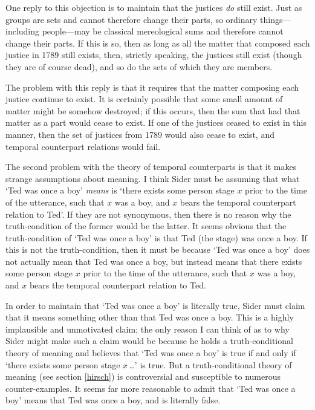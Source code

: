 \documentclass[11pt]{article}
\begin{document}
\begin{spacing}{1.5}
One reply to this objection is to maintain that the justices {\em do}
still exist.  Just as groups are sets and cannot therefore change
their parts, so ordinary things---including people---may be classical
mereological sums and therefore cannot change their parts.  If this is
so, then as long as all the matter that composed each justice in 1789
still exists, then, strictly speaking, the justices still exist
(though they are of course dead), and so do the sets of which they are
members.

The problem with this reply is that it requires that the matter
composing each justice continue to exist.  It is certainly possible
that some small amount of matter might be somehow destroyed; if this
occurs, then the sum that had that matter as a part would cease to
exist.  If one of the justices ceased to exist in this manner, then
the set of justices from 1789 would also cease to exist, and temporal
counterpart relations would fail.

The second problem with the theory of temporal counterparts is that it
makes strange assumptions about meaning.  I think Sider must be
assuming that what `Ted was once a boy' {\em means} is `there exists
some person stage $x$ prior to the time of the utterance, such that
$x$ was a boy, and $x$ bears the temporal counterpart relation to
Ted'.  If they are not synonymous, then there is no reason why the
truth-condition of the former would be the latter.  It seems obvious
that the truth-condition of `Ted was once a boy' is that Ted (the
stage) was once a boy.  If this is not the truth-condition, then it
must be because `Ted was once a boy' does not actually mean that Ted
was once a boy, but instead means that there exists some person stage
$x$ prior to the time of the utterance, such that $x$ was a boy, and
$x$ bears the temporal counterpart relation to Ted.

In order to maintain that `Ted was once a boy' is literally true,
Sider must claim that it means something other than that Ted was once
a boy.  This is a highly implausible and unmotivated claim; the only
reason I can think of as to why Sider might make such a claim would be
because he holds a truth-conditional theory of meaning and believes
that `Ted was once a boy' is true if and only if `there exists some
person stage $x$\,\ldots ' is true.  But a truth-conditional theory of
meaning (see section \ref{hirsch}) is controversial and susceptible to
numerous counter-examples.  It seems far more reasonable to admit that
`Ted was once a boy' means that Ted was once a boy, and is literally
false.


\end{spacing}
\end{document}
